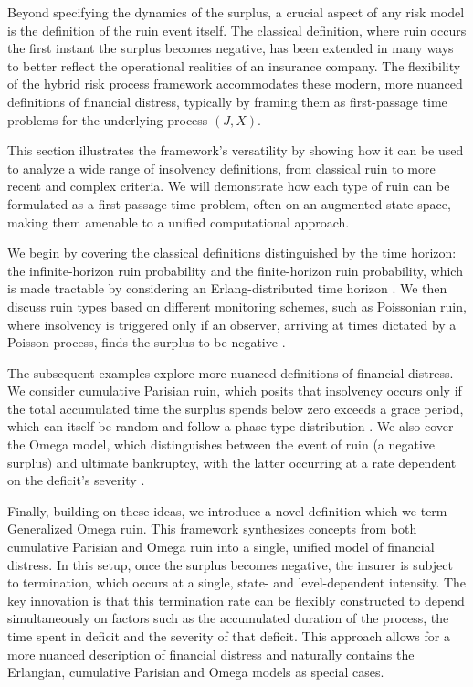 \documentclass[11pt]{article}
\numberwithin{table}{section}
\numberwithin{figure}{section}
\numberwithin{equation}{section}
\newcommand{\1}{{\mathbf 1}}
\newcommand{\0}{\mat{0}}
\begin{document}
Beyond specifying the dynamics of the surplus, a crucial aspect of any risk model is the definition of the ruin event itself. The classical definition, where ruin occurs the first instant the surplus becomes negative, has been extended in many ways to better reflect the operational realities of an insurance company. The flexibility of the hybrid risk process framework accommodates these modern, more nuanced definitions of financial distress, typically by framing them as first-passage time problems for the underlying process $(J,X)$.

This section illustrates the framework's versatility by showing how it can be used to analyze a wide range of insolvency definitions, from classical ruin to more recent and complex criteria. We will demonstrate how each type of ruin can be formulated as a first-passage time problem, often on an augmented state space, making them amenable to a unified computational approach.

We begin by covering the classical definitions distinguished by the time horizon: the infinite-horizon ruin probability and the finite-horizon ruin probability, which is made tractable by considering an Erlang-distributed time horizon \cite{asmussen2002erlangian}. We then discuss ruin types based on different monitoring schemes, such as Poissonian ruin, where insolvency is triggered only if an observer, arriving at times dictated by a Poisson process, finds the surplus to be negative \cite{albrecher2017strikingly}.

The subsequent examples explore more nuanced definitions of financial distress. We consider cumulative Parisian ruin, which posits that insolvency occurs only if the total accumulated time the surplus spends below zero exceeds a grace period, which can itself be random and follow a phase-type distribution \cite{guerin2017distribution, bladt2019parisian}. We also cover the Omega model, which distinguishes between the event of ruin (a negative surplus) and ultimate bankruptcy, with the latter occurring at a rate dependent on the deficit's severity \cite{albrecher2011gammaomega,gerber2012omega}.

Finally, building on these ideas, we introduce a novel definition which we term Generalized Omega ruin. This framework synthesizes concepts from both cumulative Parisian and Omega ruin into a single, unified model of financial distress. In this setup, once the surplus becomes negative, the insurer is subject to termination, which occurs at a single, state- and level-dependent intensity. The key innovation is that this termination rate can be flexibly constructed to depend simultaneously on factors such as the accumulated duration of the process, the time spent in deficit and the severity of that deficit. This approach allows for a more nuanced description of financial distress and naturally contains the Erlangian, cumulative Parisian and Omega models as special cases.
\end{document}
